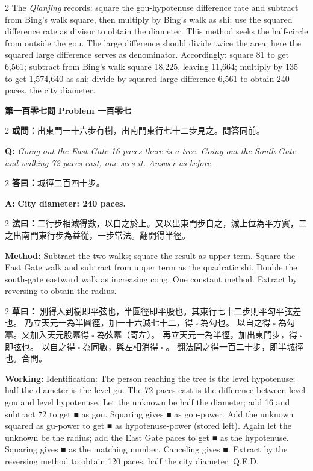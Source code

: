 \documentclass[11pt,a4paper]{article}
\let\origsquare\square
\renewcommand{\square}{\ensuremath{\origsquare}}%
\newcommand{\wen}[1]{%
  \par\vspace{0.5em}%
  \noindent\textcolor{problemcolor}{\textbf{第#1問}}%
  \hfill\textcolor{problemcolor}{\textbf{Problem #1}}\par\nopagebreak%
  \vspace{0.3em}%
}
\newcommand{\owen}[1]{%
  \noindent\textcolor{problemcolor}{\textbf{或問：}}{\tradfont #1}\par\nopagebreak%
}
\newcommand{\oweneng}[1]{%
  \noindent\textcolor{engcolor}{\textbf{Q: }}{\itshape #1}\par\nopagebreak%
}
\newcommand{\fayue}[1]{%
  \noindent\textcolor{methodcolor}{\textbf{法曰：}}{\tradfont #1}\par\nopagebreak%
}
\newcommand{\fayueeng}[1]{%
  \noindent\textcolor{engcolor}{\textbf{Method: }}{#1}\par\nopagebreak%
}
\newcommand{\tsaoyue}[1]{%
  \noindent\textcolor{workcolor}{\textbf{草曰：}}{\tradfont #1}\par%
}
\newcommand{\tsaoyueeng}[1]{%
  \noindent\textcolor{engcolor}{\textbf{Working: }}{\small #1}\par%
}
\newcommand{\dayue}[1]{%
  \noindent\textcolor{anscolor}{\textbf{答曰：}}{\tradfont #1}\par\nopagebreak%
}
\newcommand{\dayueeng}[1]{%
  \noindent\textcolor{engcolor}{\textbf{A: }}{\bfseries #1}\par\nopagebreak%
}
\begin{document}
\begin{paracol}{2}
{The \textit{Qianjing} records: square the gou-hypotenuse difference rate and subtract from Bing's walk square, then multiply by Bing's walk as shi; use the squared difference rate as divisor to obtain the diameter. This method seeks the half-circle from outside the gou. The large difference should divide twice the area; here the squared large difference serves as denominator. Accordingly: square 81 to get 6,561; subtract from Bing's walk square 18,225, leaving 11,664; multiply by 135 to get 1,574,640 as shi; divide by squared large difference 6,561 to obtain 240 paces, the city diameter.}
\end{paracol}

\vspace{0.5cm}


\wen{一百零七}

\begin{paracol}{2}
\owen{出東門一十六步有樹，出南門東行七十二步見之。問答同前。}
\switchcolumn
\oweneng{Going out the East Gate 16 paces there is a tree. Going out the South Gate and walking 72 paces east, one sees it. Answer as before.}
\end{paracol}

\begin{paracol}{2}
\dayue{城徑二百四十步。}
\switchcolumn
\dayueeng{City diameter: 240 paces.}
\end{paracol}

\begin{paracol}{2}
\fayue{二行步相減得數，以自之於上。又以出東門步自之，減上位為平方實，二之出南門東行步為益從，一步常法。翻開得半徑。}
\switchcolumn
\fayueeng{Subtract the two walks; square the result as upper term. Square the East Gate walk and subtract from upper term as the quadratic shi. Double the south-gate eastward walk as increasing cong. One constant method. Extract by reversing to obtain the radius.}
\end{paracol}

\begin{paracol}{2}
\tsaoyue{%
別得人到樹即平弦也，半圓徑即平股也。其東行七十二步則平勾平弦差也。
乃立天元一為半圓徑，加一十六減七十二，得$ \; \square \; $為勾也。
以自之得$ \; \square \; $為勾冪。又加入天元股冪得$ \; \square \; $為弦冪（寄左）。
再立天元一為半徑，加出東門步，得$ \; \square \; $即弦也。
以自之得$ \; \square \; $為同數，與左相消得$ \; \square \; $。
翻法開之得一百二十步，即半城徑也。合問。}
\switchcolumn
\tsaoyueeng{%
Identification: The person reaching the tree is the level hypotenuse; half the diameter is the level gu. The 72 paces east is the difference between level gou and level hypotenuse. Let the unknown be half the diameter; add 16 and subtract 72 to get ■ as gou. Squaring gives ■ as gou-power. Add the unknown squared as gu-power to get ■ as hypotenuse-power (stored left). Again let the unknown be the radius; add the East Gate paces to get ■ as the hypotenuse. Squaring gives ■ as the matching number. Canceling gives ■. Extract by the reversing method to obtain 120 paces, half the city diameter. Q.E.D.}
\end{paracol}
\end{document}
